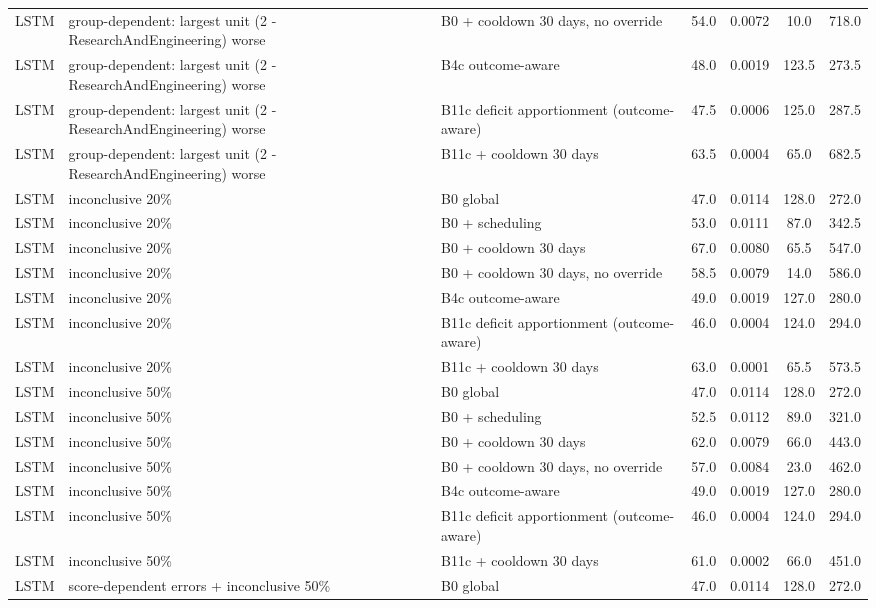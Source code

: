 \begin{longtable}{lp{5.2cm}p{4.4cm}cccc}
LSTM & group-dependent: largest unit (2 - ResearchAndEngineering) worse & B0 + cooldown 30 days, no override & 54.0 & 0.0072 & 10.0 & 718.0 \\
LSTM & group-dependent: largest unit (2 - ResearchAndEngineering) worse & B4c outcome-aware & 48.0 & 0.0019 & 123.5 & 273.5 \\
LSTM & group-dependent: largest unit (2 - ResearchAndEngineering) worse & B11c deficit apportionment (outcome-aware) & 47.5 & 0.0006 & 125.0 & 287.5 \\
LSTM & group-dependent: largest unit (2 - ResearchAndEngineering) worse & B11c + cooldown 30 days & 63.5 & 0.0004 & 65.0 & 682.5 \\
LSTM & inconclusive 20\% & B0 global & 47.0 & 0.0114 & 128.0 & 272.0 \\
LSTM & inconclusive 20\% & B0 + scheduling & 53.0 & 0.0111 & 87.0 & 342.5 \\
LSTM & inconclusive 20\% & B0 + cooldown 30 days & 67.0 & 0.0080 & 65.5 & 547.0 \\
LSTM & inconclusive 20\% & B0 + cooldown 30 days, no override & 58.5 & 0.0079 & 14.0 & 586.0 \\
LSTM & inconclusive 20\% & B4c outcome-aware & 49.0 & 0.0019 & 127.0 & 280.0 \\
LSTM & inconclusive 20\% & B11c deficit apportionment (outcome-aware) & 46.0 & 0.0004 & 124.0 & 294.0 \\
LSTM & inconclusive 20\% & B11c + cooldown 30 days & 63.0 & 0.0001 & 65.5 & 573.5 \\
LSTM & inconclusive 50\% & B0 global & 47.0 & 0.0114 & 128.0 & 272.0 \\
LSTM & inconclusive 50\% & B0 + scheduling & 52.5 & 0.0112 & 89.0 & 321.0 \\
LSTM & inconclusive 50\% & B0 + cooldown 30 days & 62.0 & 0.0079 & 66.0 & 443.0 \\
LSTM & inconclusive 50\% & B0 + cooldown 30 days, no override & 57.0 & 0.0084 & 23.0 & 462.0 \\
LSTM & inconclusive 50\% & B4c outcome-aware & 49.0 & 0.0019 & 127.0 & 280.0 \\
LSTM & inconclusive 50\% & B11c deficit apportionment (outcome-aware) & 46.0 & 0.0004 & 124.0 & 294.0 \\
LSTM & inconclusive 50\% & B11c + cooldown 30 days & 61.0 & 0.0002 & 66.0 & 451.0 \\
LSTM & score-dependent errors + inconclusive 50\% & B0 global & 47.0 & 0.0114 & 128.0 & 272.0 \\

\end{longtable}
